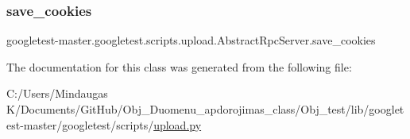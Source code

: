 \subsubsection{\texorpdfstring{save\_cookies}{save\_cookies}}
{\footnotesize\ttfamily googletest-\/master.\+googletest.\+scripts.\+upload.\+Abstract\+Rpc\+Server.\+save\+\_\+cookies}



The documentation for this class was generated from the following file\+:\begin{DoxyCompactItemize}
\item 
C\+:/\+Users/\+Mindaugas K/\+Documents/\+Git\+Hub/\+Obj\+\_\+\+Duomenu\+\_\+apdorojimas\+\_\+class/\+Obj\+\_\+test/lib/googletest-\/master/googletest/scripts/\mbox{\hyperlink{_obj__test_2lib_2googletest-master_2googletest_2scripts_2upload_8py}{upload.\+py}}\end{DoxyCompactItemize}
